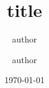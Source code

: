 \documentclass[pdf, unicode, 10pt, aspectratio=169]{beamer}
\title[title]{title}
\author[authors]{author\inst{1,2} \and author\inst{1}}
\institute{\inst{1} institute \and \inst{2} institute}
\date{\today}
\begin{document}
\customtitle


\setcounter{section}{0}
\renewcommand\appendixname{Приложения}
\renewcommand\insertsectionnumber{\Alph{section}}
\appendix

\end{document}
